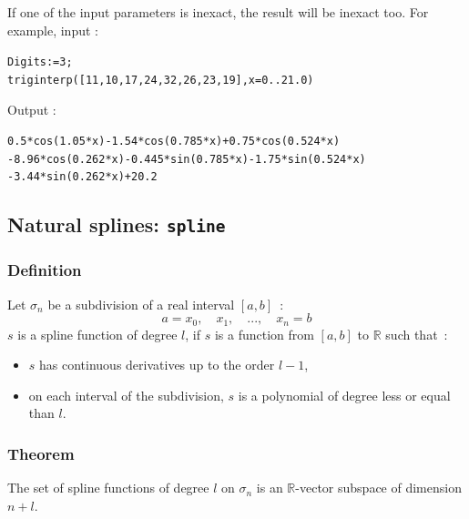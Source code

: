 \documentclass[a4paper,11pt]{book}
\begin{document}
If one of the input parameters is inexact, the result will be inexact too. For example, input :
\begin{center}
	{\tt Digits:=3;\\
		triginterp([11,10,17,24,32,26,23,19],x=0..21.0)}
\end{center}
Output :
\begin{center}
	{\tt 0.5*cos(1.05*x)-1.54*cos(0.785*x)+0.75*cos(0.524*x)\\
		-8.96*cos(0.262*x)-0.445*sin(0.785*x)-1.75*sin(0.524*x)\\
		-3.44*sin(0.262*x)+20.2}
\end{center}

\subsection{Natural splines: {\tt spline}}
\subsubsection{Definition}
Let $\sigma_n$ be a subdivision of a real interval $[a,b]$~:
\[ a=x_0,\quad x_1,\quad...,\quad x_n=b \]
$s$ is a spline function of degree $l$, if $s$ is a function from $[a,b]$ 
to $\mathbb R$ such that~:
\begin{itemize}
\item $s$ has continuous derivatives up to the order $l-1$,
\item on each interval of the subdivision, $s$ 
is a polynomial of degree less or equal than $l$.
\end{itemize}

\subsubsection{Theorem}
The set of spline functions of degree $l$ on $\sigma_n$ is an
$\mathbb R$-vector subspace of dimension $n+l$.
\end{document}
